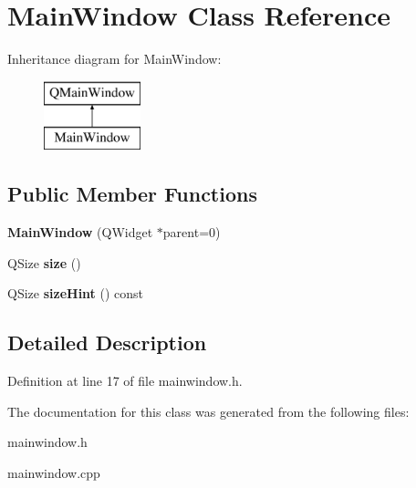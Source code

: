 \hypertarget{class_main_window}{\section{Main\-Window Class Reference}
\label{class_main_window}
}
Inheritance diagram for Main\-Window\-:\begin{figure}[H]
\begin{center}
\leavevmode
\includegraphics[height=2.000000cm]{class_main_window}
\end{center}
\end{figure}
\subsection*{Public Member Functions}
\begin{DoxyCompactItemize}
\item 
\hypertarget{class_main_window_a8b244be8b7b7db1b08de2a2acb9409db}{{\bfseries Main\-Window} (Q\-Widget $\ast$parent=0)}\label{class_main_window_a8b244be8b7b7db1b08de2a2acb9409db}

\item 
\hypertarget{class_main_window_af747387b0953cbb422b3cb52031b863c}{Q\-Size {\bfseries size} ()}\label{class_main_window_af747387b0953cbb422b3cb52031b863c}

\item 
\hypertarget{class_main_window_a781737f6e3b1f3e97e6a7eebb6396771}{Q\-Size {\bfseries size\-Hint} () const }\label{class_main_window_a781737f6e3b1f3e97e6a7eebb6396771}

\end{DoxyCompactItemize}


\subsection{Detailed Description}


Definition at line 17 of file mainwindow.\-h.



The documentation for this class was generated from the following files\-:\begin{DoxyCompactItemize}
\item 
mainwindow.\-h\item 
mainwindow.\-cpp\end{DoxyCompactItemize}
